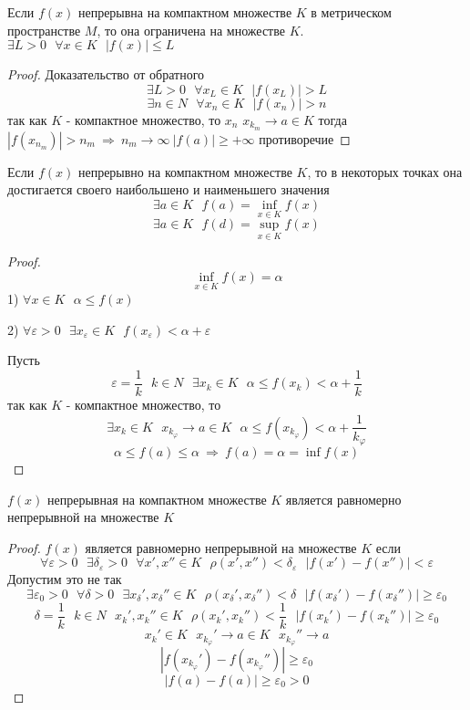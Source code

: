 \begin{theorem}
  Если $f(x)$ непрерывна на компактном множестве $K$ в метрическом пространстве
  $M$, то она ограничена на множестве $K$. $\exists L > 0 ~~~
  \forall x \in K ~~~ |f(x)| \le L$
\end{theorem}

\begin{proof}
  Доказательство от обратного
  $$
  \exists L > 0 ~~~ \forall x_L \in K ~~~ |f(x_L)| > L
  $$
  $$
  \exists n \in N ~~~ \forall x_n \in K ~~~ |f(x_n)| > n
  $$
  так как $K$ - компактное множество, то $x_n$ $x_{k_m} \to a \in K$ тогда
  $|f(x_{n_m})| > n_m ~ \Rightarrow ~ n_m \to \infty ~ |f(a)| \ge +\infty$
  противоречие
\end{proof}

\begin{theorem}
  Если $f(x)$ непрерывно на компактном множестве $K$, то в некоторых точках она
  достигается своего наибольшено и наименьшего значения
  $$
  \exists a \in K ~~~ f(a) = \inf \limits_{x \in K} f(x)
  $$
  $$
  \exists a \in K ~~~ f(d) = \sup \limits_{x \in K} f(x)
  $$
\end{theorem}

\begin{proof}
  $$
  \inf \limits_{x \in K} f(x) = \alpha
  $$
  1) $\forall x \in K ~~~ \alpha \le f(x)$

  2) $\forall \varepsilon > 0 ~~~ \exists x_{\varepsilon} \in K ~~~
  f(x_{\varepsilon}) < \alpha + \varepsilon$

  Пусть
  $$
  \varepsilon = \frac{1}{k} ~~~ k \in N ~~~ \exists x_k \in K ~~~
  \alpha \le f(x_k) < \alpha + \frac{1}{k}
  $$
  так как $K$ - компактное множество, то
  $$
  \exists x_k \in K ~~~ x_{k_{\varphi}} \to a \in K ~~~ \alpha \le
  f(x_{k_{\varphi}}) < \alpha + \frac{1}{k_{\varphi}}
  $$
  $$
  \alpha \le f(a) \le \alpha ~ \Rightarrow ~ f(a) = \alpha = \inf f(x)
  $$
\end{proof}

\begin{theorem}
  $f(x)$ непрерывная на компактном множестве $K$ является равномерно
  непрерывной на множестве $K$
\end{theorem}

\begin{proof}
  $f(x)$ является равномерно непрерывной на множестве $K$ если
  $$
  \forall \varepsilon > 0 ~~~ \exists \delta_{\varepsilon} > 0 ~~~
  \forall x', x'' \in K ~~~ \rho(x', x'') < \delta_{\varepsilon} ~~~
  |f(x') - f(x'')| < \varepsilon
  $$
  Допустим это не так
  $$
  \exists \varepsilon_0 > 0 ~~~ \forall \delta > 0 ~~~ \exists x_{\delta}',
  x_{\delta}'' \in K ~~~ \rho(x_{\delta}', x_{\delta}'') < \delta ~~~
  |f(x_{\delta}') - f(x_{\delta}'')| \ge \varepsilon_0
  $$
  $$
  \delta = \frac{1}{k} ~~~ k \in N ~~~ x_k', x_k'' \in K ~~~
  \rho(x_k', x_k'') < \frac{1}{k} ~~~ |f(x_k') - f(x_k'')| \ge \varepsilon_0
  $$
  $$
  x_k' \in K ~~~ x_{k_{\varphi}}' \to a \in K ~~~ x_{k_{\varphi}}'' \to a
  $$
  $$
  |f(x_{k_{\varphi}}') - f(x_{k_{\varphi}}'')| \ge \varepsilon_0
  $$
  $$
  |f(a) - f(a)| \ge \varepsilon_0 > 0
  $$
\end{proof}

